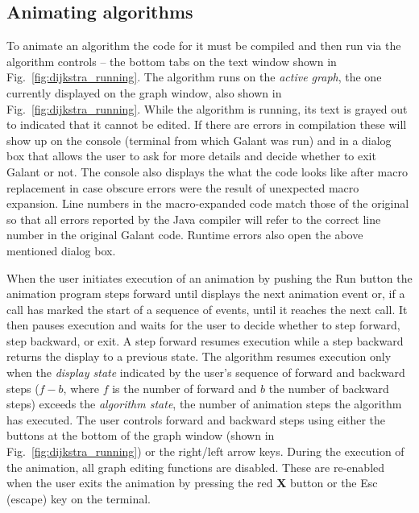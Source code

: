 \subsection{Animating algorithms}
\label{sec:animating_algorithms}



To animate an algorithm the code for it must be compiled and then run via the
algorithm controls
 -- the bottom tabs on the text window shown in Fig.~\ref{fig:dijkstra_running}.
The algorithm runs on the \emph{active graph}, the one currently displayed
on the graph window, also shown in Fig.~\ref{fig:dijkstra_running}.
While the algorithm is running, its text is grayed out to indicated that it
cannot be edited.
If there are errors in compilation these will show up on the console (terminal
from which Galant was run) and in a dialog box that allows the user to ask for more details
and decide whether to exit Galant or not.
The console also displays the what the code looks like after macro replacement
in case obscure errors were the result of unexpected macro expansion.
Line numbers in the macro-expanded code match those of the original so that
all errors reported by the Java compiler will refer to the correct line number
in the original Galant code.
Runtime errors also open the above mentioned
dialog box.

When the user initiates execution of an animation by pushing the \textsf{Run}
button
the animation program
steps forward until
displays the next animation event or, if a 
call has marked the start of a sequence of events, until
it reaches the next  call.
It then pauses execution and waits for the user to decide whether to
step forward, step backward, or exit.
A step forward resumes execution while a step backward returns the display to a previous
state.
The algorithm resumes execution only when the \emph{display state}
indicated by the user's sequence of forward and backward steps
($f-b$, where $f$ is the number of forward and $b$ the number of backward steps)
exceeds the \emph{algorithm state}, the number of animation steps the algorithm
has executed.
The user controls forward and backward steps using either the buttons at the
bottom of the graph window (shown in Fig.~\ref{fig:dijkstra_running})
or the right/left arrow keys.
During the execution of the animation, all graph editing functions are disabled.
These are re-enabled when the user exits the animation by pressing the red \textbf{X} button or the \textsf{Esc} (escape) key on the terminal.

